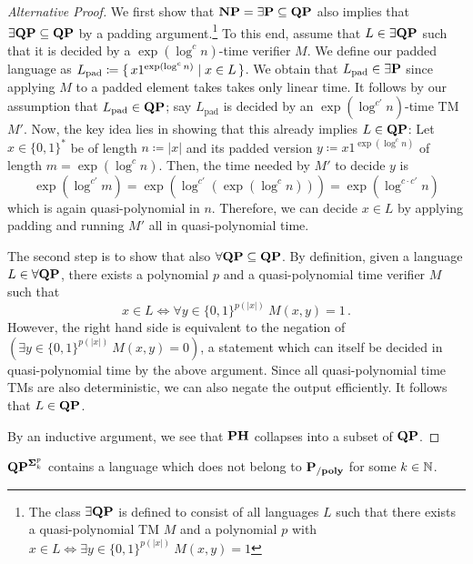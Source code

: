 \documentclass[12pt]{article}
\theoremstyle{definition}
\begin{document}
\begin{proof}[Alternative Proof]
  We first show that $\NP = \exists \P \subseteq \class{QP}$ also implies that
  $\exists \class{QP} \subseteq \class{QP}$ by a padding
  argument.\footnote{The class $\exists \class{QP}$ is defined to consist of
  all languages $L$ such that there exists a quasi-polynomial TM $M$ and a
  polynomial $p$ with $x \in L \iff \exists y \in \{0,1\}^{p(|x|)}\
  M(x,y) = 1$}
  To this end, assume that $L \in \exists \class{QP}$ such that it is decided
  by a $\exp(\log^c n)$-time verifier $M$.
  We define our padded language as
  $L_{\textrm{pad}} \coloneqq \set{ x 1^{\exp(\log^c n)} \mid x \in L }$.
  We obtain that $L_{\textrm{pad}} \in \exists \P$ since applying $M$ to a
  padded element takes takes only linear time.
  It follows by our assumption that $L_{\textrm{pad}} \in \class{QP}$;
  say $L_{\textrm{pad}}$ is decided by an $\exp(\log^{c'} n)$-time TM $M'$.
  Now, the key idea lies in showing that this already implies
  $L \in \class{QP}$:
  Let $x \in \{0,1\}^*$ be of length $n \coloneqq |x|$ and
  its padded version $y \coloneqq x 1^{\exp(\log^c n)}$ of length
  $m = \exp(\log^c n)$. Then, the time needed by $M'$ to decide $y$ is
  \[
    \exp(\log^{c'} m)
    =
    \exp(\log^{c'}(\exp(\log^c n)))
    =
    \exp(\log^{c \cdot c'} n)
  \]
  which is again quasi-polynomial in $n$.
  Therefore, we can decide $x \in L$ by applying padding and running $M'$ all
  in quasi-polynomial time.

  The second step is to show that also
  $\forall \class{QP} \subseteq \class{QP}$.
  By definition, given a language $L \in \forall \class{QP}$, there exists a
  polynomial $p$ and a quasi-polynomial time verifier $M$ such that
  \[
    x \in L \iff \forall y \in \{0,1\}^{p(|x|)}\ M(x,y) = 1 \,.
  \]
  However, the right hand side is equivalent to the negation of
  $(\exists y \in \{0,1\}^{p(|x|)}\ M(x,y) = 0)$, a statement which can itself
  be decided in quasi-polynomial time by the above argument.
  Since all quasi-polynomial time TMs are also deterministic, we can also
  negate the output efficiently. It follows that $L \in \class{QP}$.

  By an inductive argument, we see that $\class{PH}$ collapses into a subset of
  $\class{QP}$.
\end{proof}

\begin{lemma}
  \label{lem:qp-super-circ}
  $\class{QP}^{\class{\Sigma}^p_k}$ contains a language which does not belong
  to $\Ppoly$ for some $k \in \N$.
\end{lemma}
\end{document}
